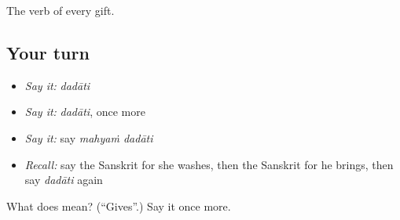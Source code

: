 \begin{grammarlens}[title={What you've built}]
The verb of every gift.
\end{grammarlens}

\subsection*{Your turn}
\begin{itemize}
\raggedright
  \item \emph{Say it:} \emph{dadāti}
  \item \emph{Say it:} \emph{dadāti}, once more
  \item \emph{Say it:} say \emph{mahyaṁ dadāti}
  \item \emph{Recall:} say the Sanskrit for she washes, then the Sanskrit for he brings, then say \emph{dadāti} again
\end{itemize}

\begin{tcolorbox}[breakable,colback=teal!4,colframe=teal!35!black,title={Before you move on}]
What does  mean? (\textquotedblleft{}Gives\textquotedblright{}.) Say it once more.
\end{tcolorbox}
